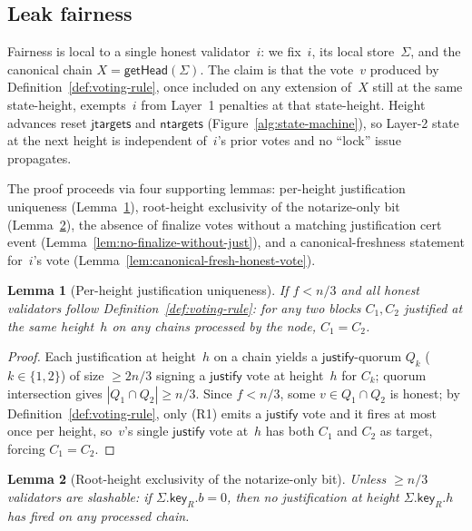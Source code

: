 \documentclass{article}
\newcommand{\just}{\ensuremath{\mathsf{justify}}\xspace}
\newcommand{\jtargets}{\mathsf{jtargets}}
\newcommand{\ntargets}{\mathsf{ntargets}}
\newcommand{\key}{\mathsf{key}}
\newcommand{\getHead}{\textsf{getHead}\xspace}
\theoremstyle{plain}
\newtheorem{lemma}{Lemma}
\theoremstyle{definition}
\theoremstyle{remark}
\begin{document}
\subsection{Leak fairness}

Fairness is local to a single honest validator~$i$: we fix~$i$, its local store~$\Sigma$, and the canonical chain $X = \getHead(\Sigma)$.
The claim is that the vote~$v$ produced by Definition~\ref{def:voting-rule}, once included on any extension of~$X$ still at the same state-height, exempts~$i$ from Layer~1 penalties at that state-height.
Height advances reset $\jtargets$ and $\ntargets$ (Figure~\ref{alg:state-machine}), so Layer-2 state at the next height is independent of~$i$'s prior votes and no ``lock'' issue propagates.

The proof proceeds via four supporting lemmas: per-height justification uniqueness (Lemma~\ref{lem:just-unique-height}), root-height exclusivity of the notarize-only bit (Lemma~\ref{lem:root-h-notarize-only}), the absence of finalize votes without a matching justification cert event (Lemma~\ref{lem:no-finalize-without-just}), and a canonical-freshness statement for~$i$'s vote (Lemma~\ref{lem:canonical-fresh-honest-vote}).

\begin{lemma}[Per-height justification uniqueness]\label{lem:just-unique-height}
If $f < n/3$ and all honest validators follow Definition~\ref{def:voting-rule}: for any two blocks $C_1, C_2$ justified at the same height~$h$ on any chains processed by the node, $C_1 = C_2$.
\end{lemma}

\begin{proof}
Each justification at height~$h$ on a chain yields a \just-quorum $Q_k$ ($k \in \{1, 2\}$) of size $\geq 2n/3$ signing a \just vote at height~$h$ for $C_k$; quorum intersection gives $|Q_1 \cap Q_2| \geq n/3$.
Since $f < n/3$, some $v \in Q_1 \cap Q_2$ is honest; by Definition~\ref{def:voting-rule}, only (R1) emits a \just vote and it fires at most once per height, so~$v$'s single \just vote at~$h$ has both $C_1$ and $C_2$ as target, forcing $C_1 = C_2$.
\end{proof}

\begin{lemma}[Root-height exclusivity of the notarize-only bit]\label{lem:root-h-notarize-only}
Unless $\geq n/3$ validators are slashable: if $\Sigma.\key_R.b = 0$, then no justification at height $\Sigma.\key_R.h$ has fired on any processed chain.
\end{lemma}
\end{document}
